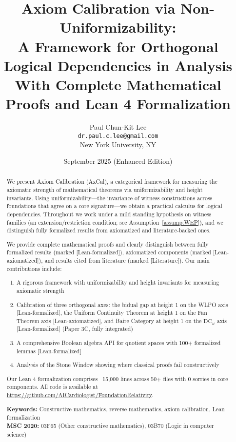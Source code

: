 \documentclass[11pt]{article}
\title{Axiom Calibration via Non-Uniformizability:\\
A Framework for Orthogonal Logical Dependencies in Analysis\\
\Large{With Complete Mathematical Proofs and Lean 4 Formalization}}
\author{Paul Chun-Kit Lee\\
\texttt{dr.paul.c.lee@gmail.com}\\
New York University, NY}
\date{September 2025 (Enhanced Edition)}
\theoremstyle{plain}
\theoremstyle{definition}
\newcommand{\DCw}{\mathrm{DC}_\omega}
\newcommand{\leanok}{\textsf{\textcolor{green!70!black}{[Lean-formalized]}}}
\newcommand{\leanaxiom}{\textsf{\textcolor{orange!80!black}{[Lean-axiomatized]}}}
\newcommand{\leancited}{\textsf{\textcolor{blue!70!black}{[Literature]}}}
\begin{document}
\maketitle

\begin{abstract}
We present Axiom Calibration (AxCal), a categorical framework for measuring the axiomatic strength of mathematical theorems via uniformizability and height invariants. Using uniformizability—the invariance of witness constructions across foundations that agree on a core signature—we obtain a practical calculus for logical dependencies. Throughout we work under a mild standing hypothesis on witness families (an extension/restriction condition; see Assumption~\ref{assump:WEP}), and we distinguish fully formalized results from axiomatized and literature-backed ones. 

We provide complete mathematical proofs and clearly distinguish between fully formalized results (marked \leanok), axiomatized components (marked \leanaxiom), and results cited from literature (marked \leancited). Our main contributions include:
\begin{enumerate}
\item A rigorous framework with uniformizability and height invariants for measuring axiomatic strength
\item Calibration of three orthogonal axes: the bidual gap at height 1 on the WLPO axis \leanok, the Uniform Continuity Theorem at height 1 on the Fan Theorem axis \leanaxiom, and Baire Category at height 1 on the $\DCw$ axis \leanok{} (Paper 3C, fully integrated)
\item A comprehensive Boolean algebra API for quotient spaces with 100+ formalized lemmas \leanok
\item Analysis of the Stone Window showing where classical proofs fail constructively
\end{enumerate}

Our Lean 4 formalization comprises ~15{,}000 lines across 50+ files with 0 sorries in core components. All code is available at \url{https://github.com/AICardiologist/FoundationRelativity}.

\vspace{0.5em}
\noindent\textbf{Keywords:} Constructive mathematics, reverse mathematics, axiom calibration, Lean formalization\\
\textbf{MSC 2020:} 03F65 (Other constructive mathematics), 03B70 (Logic in computer science)
\end{abstract}
\end{document}
